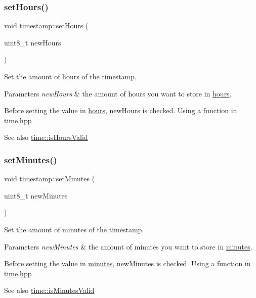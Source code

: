 \subsubsection{\texorpdfstring{set\+Hours()}{setHours()}}
{\footnotesize\ttfamily void timestamp\+::set\+Hours (\begin{DoxyParamCaption}\item[{uint8\+\_\+t}]{new\+Hours }\end{DoxyParamCaption})}



Set the amount of hours of the timestamp. 


\begin{DoxyParams}{Parameters}
{\em new\+Hours} & the amount of hours you want to store in \mbox{\hyperlink{classtimestamp_a3b2f11626563cca00d60b323ceb15191}{hours}}.\\
\hline
\end{DoxyParams}
Before setting the value in \mbox{\hyperlink{classtimestamp_a3b2f11626563cca00d60b323ceb15191}{hours}}, new\+Hours is checked. Using a function in \mbox{\hyperlink{time_8hpp_source}{time.\+hpp}} \begin{DoxySeeAlso}{See also}
\mbox{\hyperlink{classtime_afe3fbaa007cbc8072b36c8bd2a556365}{time\+::is\+Hours\+Valid}} 
\end{DoxySeeAlso}
\mbox{\label{classtimestamp_a95383562b21c79d2d3279f4c06a8cc18}} 
\subsubsection{\texorpdfstring{set\+Minutes()}{setMinutes()}}
{\footnotesize\ttfamily void timestamp\+::set\+Minutes (\begin{DoxyParamCaption}\item[{uint8\+\_\+t}]{new\+Minutes }\end{DoxyParamCaption})}



Set the amount of minutes of the timestamp. 


\begin{DoxyParams}{Parameters}
{\em new\+Minutes} & the amount of minutes you want to store in \mbox{\hyperlink{classtimestamp_a45c06ef17b96bdd37cd168faf772c63c}{minutes}}.\\
\hline
\end{DoxyParams}
Before setting the value in \mbox{\hyperlink{classtimestamp_a45c06ef17b96bdd37cd168faf772c63c}{minutes}}, new\+Minutes is checked. Using a function in \mbox{\hyperlink{time_8hpp_source}{time.\+hpp}} \begin{DoxySeeAlso}{See also}
\mbox{\hyperlink{classtime_adafa6fb7a20aee5e865a51576ab9340b}{time\+::is\+Minutes\+Valid}} 
\end{DoxySeeAlso}
\mbox{\label{classtimestamp_ac95d923ad675c4a2bff8b4b0384b6222}} 
